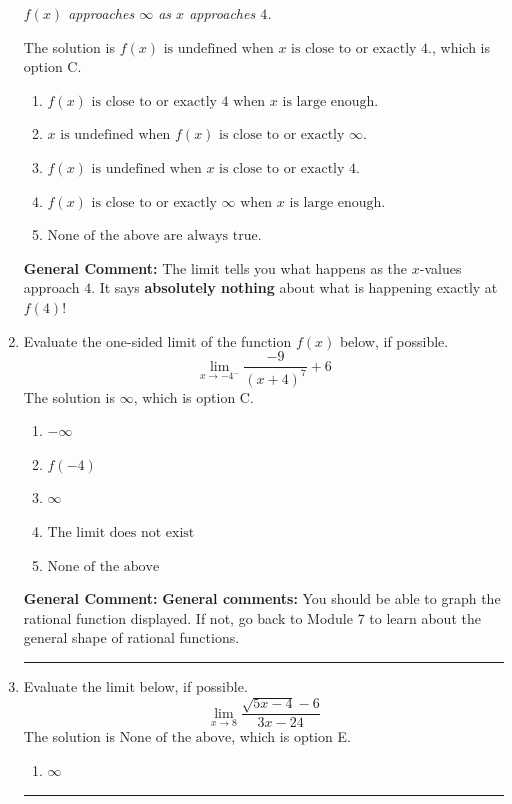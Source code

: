 \documentclass{extbook}[14pt]
\newcommand{\litem}[1]{\item #1

\rule{\textwidth}{0.4pt}}
\begin{document}
\begin{enumerate}
{\begin{center}
    \textit{ $f(x)$ approaches $\infty$ as $x$ approaches $4$. }
\end{center}
The solution is \( f(x) \text{ is undefined when } x \text{ is close to or exactly } 4. \), which is option C.\begin{enumerate}[label=\Alph*.]
\item \( f(x) \text{ is close to or exactly } 4 \text{ when } x \text{ is large enough}. \)


\item \( x \text{ is undefined when } f(x) \text{ is close to or exactly } \infty. \)


\item \( f(x) \text{ is undefined when } x \text{ is close to or exactly } 4. \)


\item \( f(x) \text{ is close to or exactly } \infty \text{ when } x \text{ is large enough}. \)


\item \( \text{None of the above are always true.} \)


\end{enumerate}

\textbf{General Comment:} The limit tells you what happens as the $x$-values approach $4$. It says \textbf{absolutely nothing} about what is happening exactly at $f(4)$!
}
\litem{
Evaluate the one-sided limit of the function $f(x)$ below, if possible.
\[ \lim_{x \rightarrow -4^-} \frac{-9}{(x+4)^7}+6 \]The solution is \( \infty \), which is option C.\begin{enumerate}[label=\Alph*.]
\item \( -\infty \)


\item \( f(-4) \)


\item \( \infty \)


\item \( \text{The limit does not exist} \)


\item \( \text{None of the above} \)


\end{enumerate}

\textbf{General Comment:} \textbf{General comments:} You should be able to graph the rational function displayed. If not, go back to Module 7 to learn about the general shape of rational functions.
}
\litem{
Evaluate the limit below, if possible.
\[ \lim_{x \rightarrow 8} \frac{\sqrt{5x - 4} - 6}{3x - 24} \]The solution is \( \text{None of the above} \), which is option E.\begin{enumerate}[label=\Alph*.]
\item \( \infty \)


\end{enumerate}}
\end{enumerate}
\end{document}
